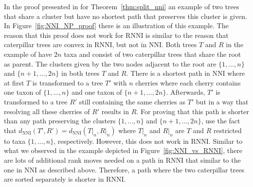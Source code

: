 \documentclass{amsart}
\newcommand{\nni}{\mathrm{NNI}}
\newcommand{\rnni}{\mathrm{RNNI}}
\begin{document}
In the proof presented in \autocite{Li1996-zw} for Theorem~\ref{thm:split_nni} an example of two trees that share a cluster but have no shortest path that preserves this cluster is given.
In Figure~\ref{fig:NNI_NP_proof} there is an illustration of this example.
The reason that this proof does not work for $\rnni$ is similar to the reason that caterpillar trees are convex in $\rnni$, but not in $\nni$.
Both trees $T$ and $R$ in the example of \autocite{Li1996-zw} have $2n$ taxa and consist of two caterpillar trees that share the root as parent.
The clusters given by the two nodes adjacent to the root are $\{1, \ldots, n\}$ and $\{n+1, \ldots, 2n\}$ in both trees $T$ and $R$.
There is a shortest path in $\nni$ where at first $T$ is transformed to a tree $T'$ with $n$ cherries where each cherry contains one taxon of $\{1, \ldots, n\}$ and one taxon of $\{n+1, \ldots, 2n\}$.
Afterwards, $T'$ is transformed to a tree $R'$ still containing the same cherries as $T'$ but in a way that resolving all these cherries of $R'$ results in $R$.
For proving that this path is shorter than any path preserving the clusters $\{1, \ldots, n\}$ and $\{n+1, \ldots, 2n\}$, \autocite{Li1996-zw} use the fact that $d_{\nni}(T',R') = d_{\nni}(T{\big|}_n, R{\big|}_n)$ where $T{\big|}_n$ and $R{\big|}_n$ are $T$ and $R$ restricted to taxa $\{1,\ldots,n\}$, respectively.
However, this does not work in $\rnni$.
Similar to what we observed in the example depicted in Figure~\ref{fig:NNI_vs_RNNI}, there are lots of additional rank moves needed on a path in $\rnni$ that similar to the one in $\nni$ as described above.
Therefore, a path where the two caterpillar trees are sorted separately is shorter in $\rnni$.
\end{document}
